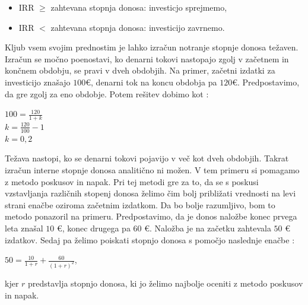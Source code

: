 \documentclass[12pt, a4paper]{amsart}
\theoremstyle{definition} %
\theoremstyle{plain} %
\begin{document}
\begin{itemize}
\item IRR $\geq$ zahtevana stopnja donosa: investicjo sprejmemo,
\item IRR $<$ zahtevana stopnja donosa: investicijo zavrnemo.
\end{itemize}


Kljub vsem svojim prednostim je lahko izračun notranje stopnje donosa težaven. Izračun se močno poenostavi, ko denarni tokovi nastopajo zgolj v začetnem in končnem obdobju, se pravi v dveh obdobjih. Na primer, začetni izdatki za investicijo znašajo $100$€, denarni tok na koncu obdobja pa $120$€. Predpostavimo, da gre zgolj za eno obdobje. Potem rešitev dobimo kot \cite[str. 157]{Mramor}:\\

\begin{center}
$100 = \tfrac{120}{1+k}$\\[0,5cm]
$k = \tfrac{120}{100} - 1$\\[0,5 cm]
$k = 0,2$
\end{center}

Težava nastopi, ko se denarni tokovi pojavijo v več kot dveh obdobjih. Takrat izračun interne stopnje donosa analitično ni možen. V tem primeru si pomagamo z metodo poskusov in napak. Pri tej metodi gre za to, da se s poskusi vzstavljanja različnih stopenj donosa želimo čim bolj približati vrednosti na levi strani enačbe oziroma začetnim izdatkom. Da bo bolje razumljivo, bom to metodo ponazoril na primeru. Predpostavimo, da je donos naložbe konec prvega leta znašal $10$ €, konec drugega pa $60$ €. Naložba je na začetku zahtevala $50$ € izdatkov. Sedaj pa želimo poiskati stopnjo donosa s pomočjo naslednje enačbe \cite[str. 158]{Mramor}:\\

\begin{center}
$50 = \tfrac{10}{1+r} + \tfrac{60}{(1+r)^2}$,
\end{center}
kjer $r$ predstavlja stopnjo donosa, ki jo želimo najbolje oceniti z metodo poskusov in napak.
\end{document}
